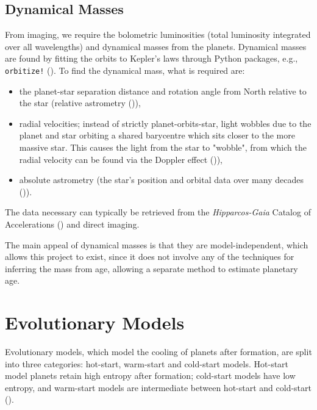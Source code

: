 \documentclass[11pt]{report}
\begin{document}
\begin{mainf}

\subsection{Dynamical Masses}
From imaging, we require the bolometric luminosities (total luminosity integrated over all wavelengths) and dynamical masses from the planets. Dynamical masses are found by fitting the orbits to Kepler's laws through Python packages, e.g., \texttt{orbitize!} (\citealp{Blunt2024}).
To find the dynamical mass, what is required are:
\begin{itemize}
    \item the planet-star separation distance and rotation angle from North relative to the star (relative astrometry (\citealp{Currie2023})),
    \item radial velocities; instead of strictly planet-orbits-star, light wobbles due to the planet and star orbiting a shared barycentre which sits closer to the more massive star. This causes the light from the star to "wobble", from which the radial velocity can be found via the Doppler effect (\citealp{Currie2023})),
    \item absolute astrometry (the star's position and orbital data over many decades (\citealp{Brandt2021b})).
\end{itemize}

The data necessary can typically be retrieved from the \textit{Hipparcos-Gaia} Catalog of Accelerations (\citealp{Brandt2021b}) and direct imaging.

The main appeal of dynamical masses is that they are model-independent, which allows this project to exist, since it does not involve any of the techniques for inferring the mass from age, allowing a separate method to estimate planetary age.


\section{Evolutionary Models}\label{sec:Emodels}
Evolutionary models, which model the cooling of planets after formation, are split into three categories: hot-start, warm-start and cold-start models. 
Hot-start model planets retain high entropy after formation; cold-start models have low entropy, and warm-start models are intermediate between hot-start and cold-start (\citealp{Bowler2016a,Bussmann2026}). 


\end{mainf}
\end{document}
